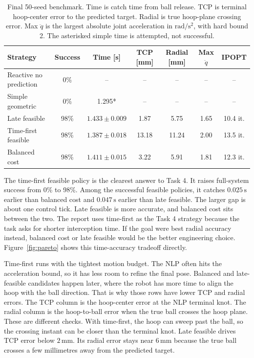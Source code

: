 \documentclass[a4paper,10pt]{article}
\begin{document}
\begin{table}[H]
\centering
\caption{Final 50-seed benchmark. Time is catch time from ball release. TCP is terminal hoop-center error to the predicted target. Radial is true hoop-plane crossing error. Max \(\ddot q\) is the largest absolute joint acceleration in \(\mathrm{rad/s^2}\), with hard bound 2. The asterisked simple time is attempted, not successful.}
\label{tab:summary}
\begin{tabular}{@{}lcccccc@{}}
\toprule
Strategy & Success & Time [s] & TCP [mm] & Radial [mm] & Max \(\ddot q\) & IPOPT \\
\midrule
Reactive no prediction & 0\% & -- & -- & -- & -- & -- \\
Simple geometric & 0\% & 1.295* & -- & -- & -- & -- \\
Late feasible & 98\% & \(1.433\pm0.009\) & 1.87 & 5.75 & 1.65 & 10.4 it. \\
Time-first feasible & 98\% & \(1.387\pm0.018\) & 13.18 & 11.24 & 2.00 & 13.5 it. \\
Balanced cost & 98\% & \(1.411\pm0.015\) & 3.22 & 5.91 & 1.81 & 12.3 it. \\
\bottomrule
\end{tabular}
\end{table}
The time-first feasible policy is the clearest answer to Task 4. It raises full-system success from 0\% to 98\%. Among the successful feasible policies, it catches \(0.025\,\mathrm{s}\) earlier than balanced cost and \(0.047\,\mathrm{s}\) earlier than late feasible. The larger gap is about one control tick. Late feasible is more accurate, and balanced cost sits between the two. The report uses time-first as the Task 4 strategy because the task asks for shorter interception time. If the goal were best radial accuracy instead, balanced cost or late feasible would be the better engineering choice. Figure~\ref{fig:pareto} shows this time-accuracy tradeoff directly.

Time-first runs with the tightest motion budget. The NLP often hits the acceleration bound, so it has less room to refine the final pose. Balanced and late-feasible candidates happen later, where the robot has more time to align the hoop with the ball direction. That is why those rows have lower TCP and radial errors. The TCP column is the hoop-center error at the NLP terminal knot. The radial column is the hoop-to-ball error when the true ball crosses the hoop plane. These are different checks. With time-first, the hoop can sweep past the ball, so the crossing instant can be closer than the terminal knot. Late feasible drives TCP error below \(2\,\mathrm{mm}\). Its radial error stays near \(6\,\mathrm{mm}\) because the true ball crosses a few millimetres away from the predicted target.
\end{document}

